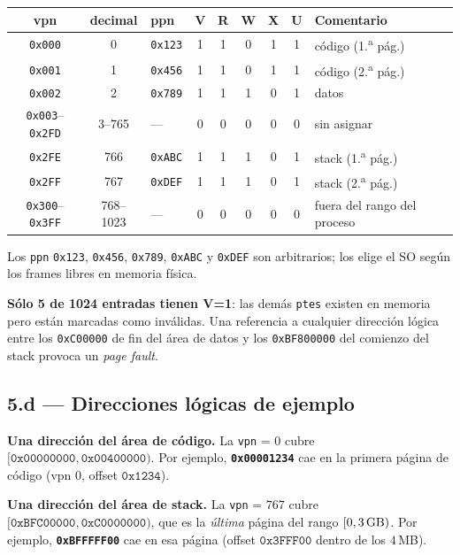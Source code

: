 \documentclass[11pt,a4paper]{article}
\begin{document}
\begin{center}
\small
\begin{tabular}{@{}cclcccccp{4.5cm}@{}}
\toprule
vpn & decimal & ppn & V & R & W & X & U & Comentario \\
\midrule
\texttt{0x000} & 0   & \texttt{0x123} & 1 & 1 & 0 & 1 & 1 & código (1.\textsuperscript{a} pág.) \\
\texttt{0x001} & 1   & \texttt{0x456} & 1 & 1 & 0 & 1 & 1 & código (2.\textsuperscript{a} pág.) \\
\texttt{0x002} & 2   & \texttt{0x789} & 1 & 1 & 1 & 0 & 1 & datos \\
\texttt{0x003}--\texttt{0x2FD} & 3--765   & --- & 0 & 0 & 0 & 0 & 0 & sin asignar \\
\texttt{0x2FE} & 766 & \texttt{0xABC} & 1 & 1 & 1 & 0 & 1 & stack (1.\textsuperscript{a} pág.) \\
\texttt{0x2FF} & 767 & \texttt{0xDEF} & 1 & 1 & 1 & 0 & 1 & stack (2.\textsuperscript{a} pág.) \\
\texttt{0x300}--\texttt{0x3FF} & 768--1023 & --- & 0 & 0 & 0 & 0 & 0 & fuera del rango del proceso \\
\bottomrule
\end{tabular}
\end{center}

Los \texttt{ppn} \texttt{0x123}, \texttt{0x456}, \texttt{0x789},
\texttt{0xABC} y \texttt{0xDEF} son arbitrarios; los elige el SO según
los frames libres en memoria física.

\begin{idea}
\textbf{Sólo 5 de 1024 entradas tienen V=1}: las demás \texttt{ptes}
existen en memoria pero están marcadas como inválidas. Una referencia
a cualquier dirección lógica entre los \texttt{0xC00000} de fin del
área de datos y los \texttt{0xBF800000} del comienzo del stack provoca
un \emph{page fault}.
\end{idea}

\subsection{5.d --- Direcciones lógicas de ejemplo}

\textbf{Una dirección del área de código.} La \texttt{vpn} = $0$
cubre $[\texttt{0x00000000}, \texttt{0x00400000})$. Por ejemplo,
\textbf{\texttt{0x00001234}} cae en la primera página de código (vpn
$0$, offset $\texttt{0x1234}$).

\textbf{Una dirección del área de stack.} La \texttt{vpn} = $767$
cubre $[\texttt{0xBFC00000}, \texttt{0xC0000000})$, que es la
\emph{última} página del rango $[0, 3\text{\,GB})$. Por ejemplo,
\textbf{\texttt{0xBFFFFF00}} cae en esa página (offset
$\texttt{0x3FFF00}$ dentro de los $4$\,MB).
\end{document}
